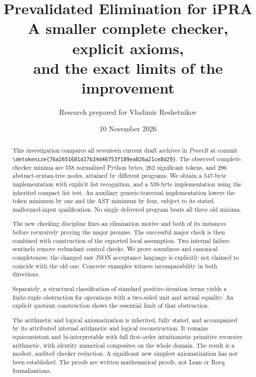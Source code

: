 \documentclass[11pt,letterpaper]{article}
\title{\color{ink}\bfseries Prevalidated Elimination for iPRA\\[8pt]
\large A smaller complete checker, explicit axioms,\\and the exact limits of the improvement}
\author{Research prepared for Vladimir Reshetnikov}
\date{10 November 2026}
\theoremstyle{definition}\newtheorem{definition}[theorem]{Definition}
\theoremstyle{remark}\newtheorem{remark}[theorem]{Remark}
\newcommand{\file}[1]{\expandafter\nolinkurl\expandafter{\detokenize{#1}}}
\begin{document}
\maketitle
\begin{abstract}
This investigation compares all seventeen current draft archives in
\emph{ProveIt} at commit
\file{76a2651601d17b34d46753f189ea026a21ce8d29}.
The observed complete-checker minima are 558 normalized Python bytes,
262 significant tokens, and 296 abstract-syntax-tree nodes, attained by
different programs. We obtain a 547-byte implementation with explicit
list recognition, and a 539-byte implementation using the inherited
compact list test. An auxiliary generic-traversal implementation lowers
the token minimum by one and the AST minimum by four, subject to its stated malformed-input
qualification. No single delivered program beats all three old minima.

The new checking discipline fixes an elimination motive and both of its
instances before recursively proving the major premise. The successful
major check is then combined with construction of the exported local
assumption. Two internal failure sentinels remove redundant control
checks. We prove soundness and canonical completeness; the changed raw
JSON acceptance language is explicitly not claimed to coincide with the
old one. Concrete examples witness incomparability in both directions.

Separately, a structural classification of standard positive-iteration
terms yields a finite-tuple obstruction for operations with a two-sided
unit and actual equality. An explicit quotient construction shows the
essential limit of that obstruction.

The arithmetic and logical axiomatization is inherited, fully stated,
and accompanied by its attributed internal arithmetic and logical
reconstruction. It remains equiconsistent and bi-interpretable with full
first-order intuitionistic primitive recursive arithmetic, with identity
numerical composites on the whole domain. The result is a modest, audited
checker reduction. A significant new simplest axiomatization has not
been established. The proofs are written mathematical proofs, not
Lean or Rocq formalizations.
\end{abstract}
\begin{center}
\end{center}
\clearpage
\setcounter{tocdepth}{1}
\hypersetup{bookmarksdepth=2}
\begingroup\small\setlength{\parskip}{0pt}\tableofcontents\endgroup
\clearpage






\clearpage
\appendix
\end{document}
